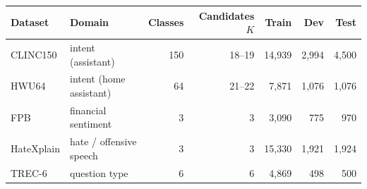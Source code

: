 \begin{tabular}{llrrrrr}
\toprule
Dataset & Domain & Classes & Candidates $K$ & Train & Dev & Test \\
\midrule
CLINC150 & intent (assistant) & 150 & 18--19 & 14,939 & 2,994 & 4,500 \\
HWU64 & intent (home assistant) & 64 & 21--22 & 7,871 & 1,076 & 1,076 \\
FPB & financial sentiment & 3 & 3 & 3,090 & 775 & 970 \\
HateXplain & hate / offensive speech & 3 & 3 & 15,330 & 1,921 & 1,924 \\
TREC-6 & question type & 6 & 6 & 4,869 & 498 & 500 \\
\bottomrule
\end{tabular}

